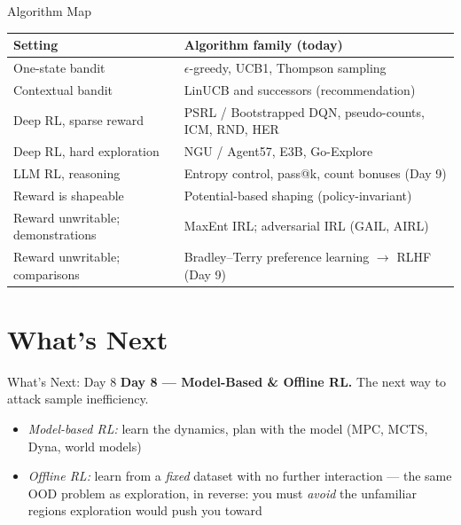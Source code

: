 \begin{frame}{Algorithm Map}
\begin{center}
\renewcommand{\arraystretch}{1.3}
\footnotesize
\begin{tabular}{p{}p{}}
\hline
\textbf{Setting} & \textbf{Algorithm family (today)} \\
\hline
One-state bandit                          & $\epsilon$-greedy, UCB1, Thompson sampling \\
Contextual bandit                         & LinUCB and successors (recommendation) \\
Deep RL, sparse reward                    & PSRL / Bootstrapped DQN, pseudo-counts, ICM, RND, HER \\
Deep RL, hard exploration                 & NGU / Agent57, E3B, Go-Explore \\
LLM RL, reasoning                         & Entropy control, pass@k, count bonuses (Day 9) \\
Reward is shapeable                       & Potential-based shaping (policy-invariant) \\
Reward unwritable; demonstrations         & MaxEnt IRL; adversarial IRL (GAIL, AIRL) \\
Reward unwritable; comparisons            & Bradley--Terry preference learning $\to$ RLHF (Day 9) \\
\hline
\end{tabular}
\end{center}
\end{frame}

\section{What's Next}
\begin{frame}[t]{What's Next: Day 8}
\vspace{0.4em}
\textbf{Day 8 --- Model-Based \& Offline RL.} The next way to attack sample inefficiency.
\vspace{0.5em}
\begin{itemize}
    \setlength{\itemsep}{0.55em}
    \item \emph{Model-based RL:} learn the dynamics, plan with the model (MPC, MCTS, Dyna, world models)
    \item \emph{Offline RL:} learn from a \emph{fixed} dataset with no further interaction --- the same OOD problem as exploration, in reverse: you must \emph{avoid} the unfamiliar regions exploration would push you toward
\end{itemize}
\end{frame}

